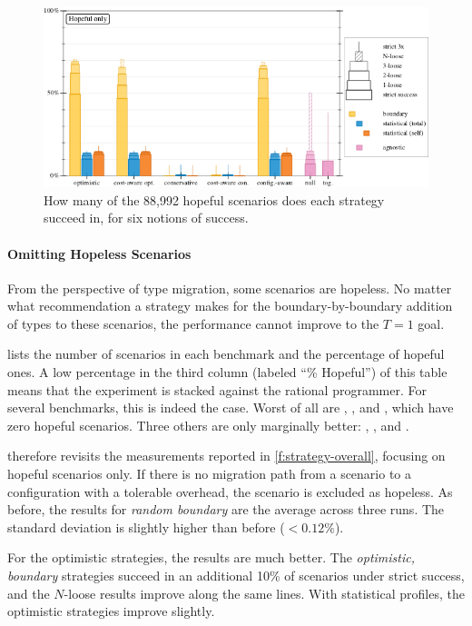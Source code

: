 \begin{figure}[ht]
  \includegraphics[width=\columnwidth]{data/strategy-overall-hopeful.pdf}
  \caption{How many of the 88,992 hopeful scenarios does each strategy succeed in, for six notions of success.}
  \label{f:strategy-hope}
\end{figure}

\paragraph{Omitting Hopeless Scenarios} From the perspective of type
migration, some scenarios are hopeless. No matter what recommendation a strategy
makes for the boundary-by-boundary addition of types to these scenarios,
the performance cannot improve to the $T=1$ goal.

 lists the number of scenarios in each benchmark and the
percentage of hopeful ones. A low percentage in the third column (labeled ``\%
Hopeful'') of this table means that the experiment is stacked against the rational
programmer.  For several benchmarks, this is indeed the case.  Worst of all are
, , and , which have zero hopeful
scenarios.  Three others are only marginally better: ,
, and .

 therefore revisits the measurements reported in
\cref{f:strategy-overall}, focusing on hopeful scenarios only.  If there is no
migration path from a scenario to a configuration with a tolerable overhead, the
scenario is excluded as hopeless.  As before, the results for \emph{random
boundary} are the average across three runs.  The standard deviation is slightly
higher than before ($<0.12\%$).

For the optimistic strategies, the results are much better.  The
\emph{optimistic, boundary} strategies succeed in an additional 10\% of
scenarios under strict success, and the $N$-loose results improve along
the same lines.  With statistical profiles, the optimistic strategies
improve slightly.

